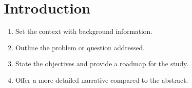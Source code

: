 \section{Introduction}

\begin{enumerate}
    \item Set the context with background information.
    \item Outline the problem or question addressed.
    \item State the objectives and provide a roadmap for the study.
    \item Offer a more detailed narrative compared to the abstract.
\end{enumerate}